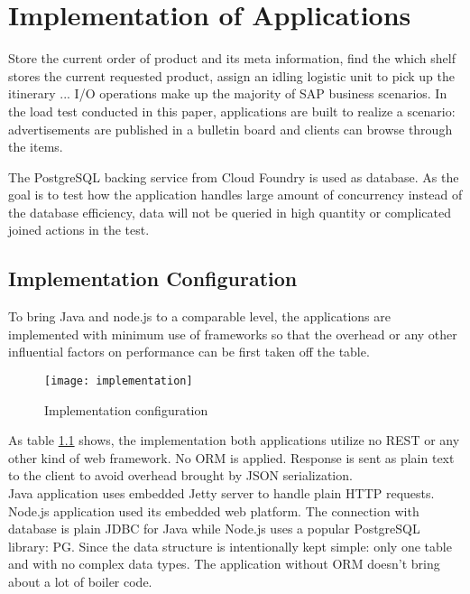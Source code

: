 \chapter{Implementation of Applications}
Store the current order of product and its meta information, find the which shelf stores the current requested product, assign an idling logistic unit to pick up the itinerary ... I/O operations make up the majority of SAP business scenarios. 
 In the load test conducted in this paper, applications are built to realize a scenario: advertisements are published in a bulletin board and clients can browse through the items. 

The PostgreSQL backing service from Cloud Foundry is used as database. As the goal is to test how the application handles large amount of concurrency instead of the database efficiency, data will not be queried in high quantity or complicated joined actions  in the test. 

\section{Implementation Configuration}
To bring Java and node.js to a comparable level, the applications are implemented with minimum use of frameworks so that the overhead or any other influential factors on performance can be first taken off the table.
 \begin{figure}[h]
 	\centering
 	\texttt{[image: implementation]}
 	\caption{Implementation configuration}
 	\label{implementation}
 \end{figure}
As table \ref{implementation} shows,  the implementation both applications utilize no REST or any other kind of web framework. No ORM is applied. Response is sent as plain text to the client to avoid overhead brought by JSON serialization. \\
Java application uses embedded Jetty server to handle plain HTTP requests. Node.js application used its embedded web platform. The connection with database is plain JDBC for Java while Node.js uses a popular PostgreSQL library: PG. Since the data structure is intentionally kept simple: only one table and with no complex data types. The application without ORM doesn't bring about a lot of boiler code.  \\

